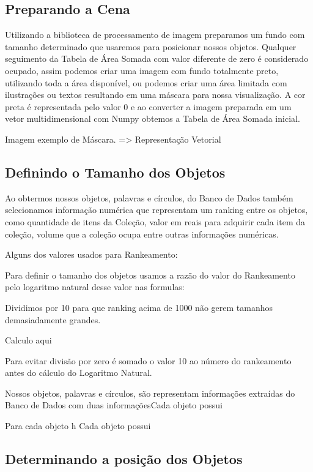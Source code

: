 \documentclass[12pt]{article}
\begin{document}
\subsection{Preparando a Cena}

Utilizando a biblioteca de processamento de imagem preparamos um fundo com tamanho determinado que usaremos para posicionar nossos objetos. 
Qualquer seguimento da Tabela de Área Somada com valor diferente de zero é considerado ocupado, assim podemos criar uma imagem com fundo totalmente preto, utilizando toda a área disponível, ou podemos criar uma área limitada com ilustrações ou textos resultando em uma máscara para nossa visualização.
A cor preta é representada pelo valor 0 e ao converter a imagem preparada em um vetor multidimensional com Numpy obtemos a Tabela de Área Somada inicial.


Imagem exemplo de Máscara. => Representação Vetorial


\subsection{Definindo o Tamanho dos Objetos}

Ao obtermos nossos objetos, palavras e círculos, do Banco de Dados também selecionamos informação numérica que representam um ranking entre os objetos, como quantidade de itens da Coleção, valor em reais para adquirir cada item da coleção, volume que a coleção ocupa entre outras informações numéricas.

Alguns dos valores usados para Rankeamento:


Para definir o tamanho dos objetos usamos a razão do valor do Rankeamento pelo logaritmo natural desse valor nas formulas:

Dividimos por 10 para que ranking acima de 1000 não gerem tamanhos demasiadamente grandes. 

{Calculo aqui}

Para evitar divisão por zero é somado o valor 10 ao número do rankeamento antes do cálculo do Logaritmo Natural.

 


Nossos objetos, palavras e círculos, são representam informações extraídas do Banco de Dados com duas informaçõesCada objeto possui 


Para cada objeto h
Cada objeto possui



\subsection{Determinando a posição dos Objetos}
\end{document}
